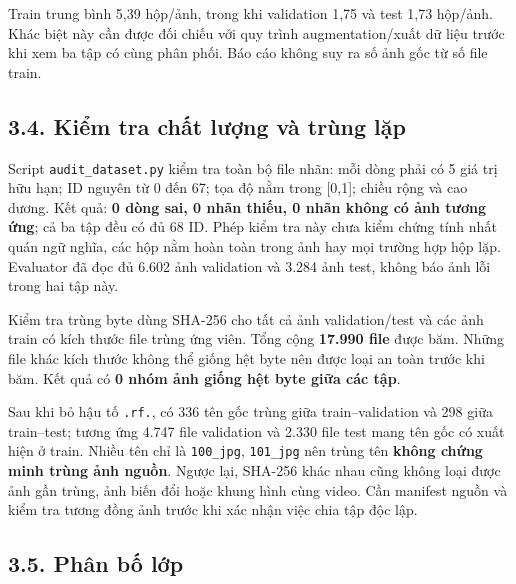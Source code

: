 \documentclass[
  vietnamese,
  12pt,
  a4paper,
]{article}
\begin{document}
Train trung bình 5,39 hộp/ảnh, trong khi validation 1,75 và test 1,73
hộp/ảnh. Khác biệt này cần được đối chiếu với quy trình
augmentation/xuất dữ liệu trước khi xem ba tập có cùng phân phối. Báo
cáo không suy ra số ảnh gốc từ số file train.

\subsection{3.4. Kiểm tra chất lượng và trùng
lặp}\label{kiux1ec3m-tra-chux1ea5t-lux1b0ux1ee3ng-vuxe0-truxf9ng-lux1eb7p}

Script
\texttt{a\allowbreak{}u\allowbreak{}d\allowbreak{}i\allowbreak{}t\allowbreak{}\_\allowbreak{}d\allowbreak{}a\allowbreak{}t\allowbreak{}a\allowbreak{}s\allowbreak{}e\allowbreak{}t\allowbreak{}.\allowbreak{}p\allowbreak{}y\allowbreak{}}
kiểm tra toàn bộ file nhãn: mỗi dòng phải có 5 giá trị hữu hạn; ID
nguyên từ 0 đến 67; tọa độ nằm trong {[}0,1{]}; chiều rộng và cao dương.
Kết quả: \textbf{0 dòng sai, 0 nhãn thiếu, 0 nhãn không có ảnh tương
ứng}; cả ba tập đều có đủ 68 ID. Phép kiểm tra này chưa kiểm chứng tính
nhất quán ngữ nghĩa, các hộp nằm hoàn toàn trong ảnh hay mọi trường hợp
hộp lặp. Evaluator đã đọc đủ 6.602 ảnh validation và 3.284 ảnh test,
không báo ảnh lỗi trong hai tập này.

Kiểm tra trùng byte dùng SHA-256 cho tất cả ảnh validation/test và các
ảnh train có kích thước file trùng ứng viên. Tổng cộng \textbf{17.990
file} được băm. Những file khác kích thước không thể giống hệt byte nên
được loại an toàn trước khi băm. Kết quả có \textbf{0 nhóm ảnh giống hệt
byte giữa các tập}.

Sau khi bỏ hậu tố
\texttt{.\allowbreak{}r\allowbreak{}f\allowbreak{}.\allowbreak{}}, có
336 tên gốc trùng giữa train--validation và 298 giữa train--test; tương
ứng 4.747 file validation và 2.330 file test mang tên gốc có xuất hiện ở
train. Nhiều tên chỉ là
\texttt{1\allowbreak{}0\allowbreak{}0\allowbreak{}\_\allowbreak{}j\allowbreak{}p\allowbreak{}g\allowbreak{}},
\texttt{1\allowbreak{}0\allowbreak{}1\allowbreak{}\_\allowbreak{}j\allowbreak{}p\allowbreak{}g\allowbreak{}}
nên trùng tên \textbf{không chứng minh trùng ảnh nguồn}. Ngược lại,
SHA-256 khác nhau cũng không loại được ảnh gần trùng, ảnh biến đổi hoặc
khung hình cùng video. Cần manifest nguồn và kiểm tra tương đồng ảnh
trước khi xác nhận việc chia tập độc lập.

\subsection{3.5. Phân bố lớp}\label{phuxe2n-bux1ed1-lux1edbp}
\end{document}
